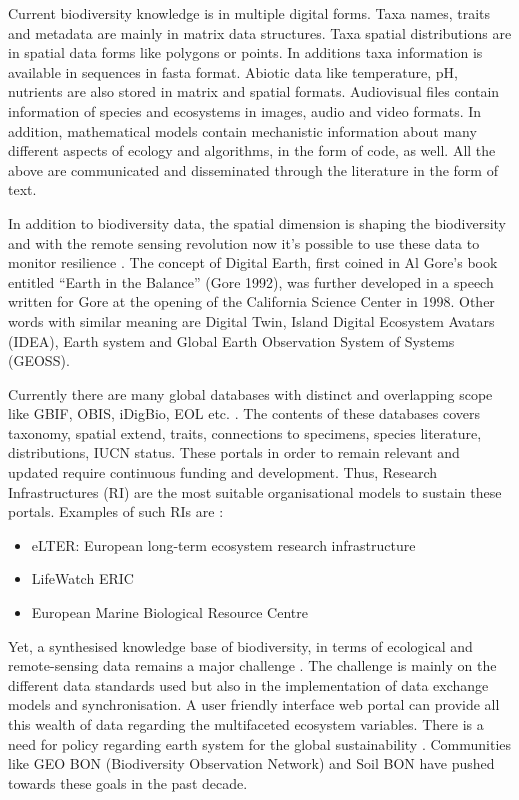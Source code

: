 Current biodiversity knowledge is in multiple digital forms. 
Taxa names, traits and metadata are mainly in matrix data
structures. Taxa spatial distributions are in spatial data
forms like polygons or points. In additions taxa information
is available in sequences in fasta format. Abiotic data like 
temperature, pH, nutrients are also stored in matrix
and spatial formats. Audiovisual files contain information
of species and ecosystems in images, audio and video formats.
In addition, mathematical models contain mechanistic information
about many different aspects of ecology and algorithms, in the 
form of code, as well. All the above are communicated and disseminated through the
literature in the form of text.


In addition to biodiversity data, the spatial dimension is shaping the biodiversity and with the remote sensing revolution now
it's possible to use these data to monitor resilience \parencite{Lenton2022resilience}. 
The concept of Digital Earth, first coined in Al Gore’s book entitled 
“Earth in the Balance” (Gore 1992), was further developed in a speech
written for Gore at the opening of the California Science Center in 1998. Other words with
similar meaning are Digital Twin, Island Digital Ecosystem Avatars (IDEA), Earth system
and Global Earth Observation System of Systems (GEOSS).


Currently there are many global databases with distinct and overlapping 
scope like GBIF, OBIS, iDigBio, EOL etc. \parencite{feng2022Review}. 
The contents of these databases covers taxonomy, spatial extend, traits, 
connections to specimens, species literature, distributions,
IUCN status. These portals in order to remain relevant and updated require 
continuous funding and development. Thus, Research Infrastructures (RI) are 
the most suitable organisational models to sustain these portals. Examples 
of such RIs are :

\begin{itemize}

    \item eLTER: European long-term ecosystem research infrastructure 
    \item LifeWatch ERIC
    \item European Marine Biological Resource Centre

\end{itemize}

Yet, a synthesised knowledge base of biodiversity, in terms of ecological and
remote-sensing data remains a major challenge \parencite{feng2022Review}. The challenge
is mainly on the different data standards used but also in the implementation of 
data exchange models and synchronisation.
A user friendly interface web portal can provide all this wealth of data
regarding the multifaceted ecosystem variables. There is a need for policy regarding earth system for the global
sustainability \parencite{reid2010earth}. Communities like GEO BON (Biodiversity Observation Network) and Soil BON
have pushed towards these goals in the past decade.

